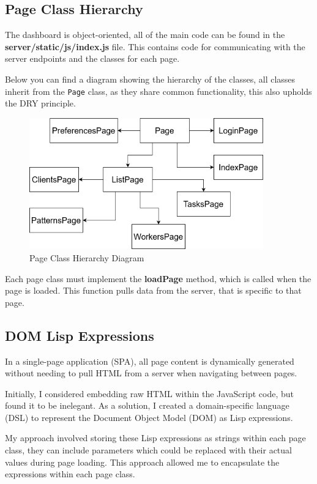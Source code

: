 \subsection {Page Class Hierarchy}
The dashboard is object-oriented,
all of the main code can be found in
the \textbf{server/static/js/index.js} file.
This contains code for communicating with
the server endpoints and the classes for each page.

Below you can find a diagram showing the hierarchy of the classes,
all classes inherit from the \texttt{Page} class,
as they share common functionality,
this also upholds the DRY principle.

\begin{figure}[h!]
    \includegraphics[width=0.9\textwidth]{images/diagrams/dashboard_hierarchy.drawio}
    \caption{Page Class Hierarchy Diagram}
    \label{image:sysArchitecture}
\end{figure}

Each page class must implement the \textbf{loadPage} method,
which is called when the page is loaded.
This function pulls data from the server,
that is specific to that page.

\subsection{DOM Lisp Expressions}
In a single-page application (SPA), all page content
is dynamically generated without
needing to pull HTML from a server when navigating between pages.

Initially, I considered embedding raw HTML within the JavaScript code,
but found it to be inelegant.
As a solution, I created a domain-specific language (DSL)
to represent the Document Object Model (DOM) as Lisp expressions.

My approach involved storing these Lisp expressions as strings within each page class,
they can include parameters which could be replaced
with their actual values during page loading.
This approach allowed me to encapsulate the expressions within each page class.

